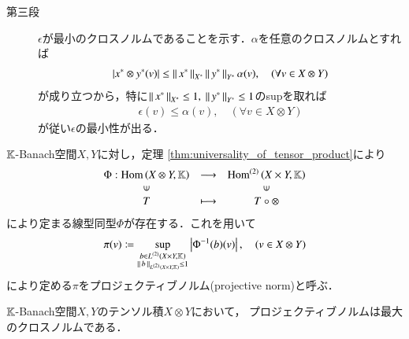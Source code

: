 \begin{prf}
\begin{description}
			\item[第三段]
				$\epsilon$が最小のクロスノルムであることを示す．$\alpha$を任意のクロスノルムとすれば
				\begin{align}
					\left| x^* \otimes y^* (v) \right| \leq \Norm{x^*}{X^*} \Norm{y^*}{Y^*} \alpha(v),
					\quad (\forall v \in X \otimes Y)
				\end{align}
				が成り立つから，特に$\Norm{x^*}{X^*} \leq 1,\ \Norm{y^*}{Y^*} \leq 1$のsupを取れば
				\begin{align}
					\epsilon(v) \leq \alpha(v),
					\quad (\forall v \in X \otimes Y)
				\end{align}
				が従い$\epsilon$の最小性が出る．
				\QED
		\end{description}
	\end{prf}
	
	\begin{screen}
		\begin{dfn}[プロジェクティブノルム]
			$\K$-Banach空間$X,Y$に対し，定理
			\ref{thm:universality_of_tensor_product}により
			\begin{align}
				\begin{array}{ccc}
					\Phi:\Hom{X \otimes Y}{\K} & \longrightarrow & \Ln{X \times Y}{\K}{2} \\
					\rotatebox{90}{$\in$} & & \rotatebox{90}{$\in$} \\
					T & \longmapsto & T \circ \otimes
				\end{array}
			\end{align}
			により定まる線型同型$\Phi$が存在する．これを用いて
			\begin{align}
				\pi(v) \coloneqq
				\sup{\substack{b \in \ContLn{X \times Y}{\K}{2} \\ \Norm{b}{\ContLn{X \times Y}{\K}{2}} \leq 1}}{\left| \Phi^{-1}(b)(v) \right|},
				\quad (v \in X \otimes Y)
			\end{align}
			により定める$\pi$をプロジェクティブノルム(projective norm)と呼ぶ．
		\end{dfn}
	\end{screen}
	
	\begin{screen}
		\begin{thm}[プロジェクティブノルムは最大のクロスノルム]
			$\K$-Banach空間$X,Y$のテンソル積$X \otimes Y$において，
			プロジェクティブノルムは最大のクロスノルムである．
		\end{thm}
	\end{screen}
	
